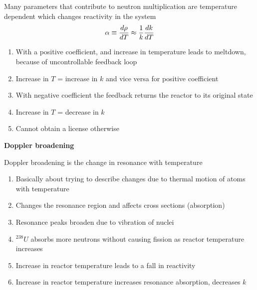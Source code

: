\documentclass[aspectratio=1610,pdftex,dvipsnames,compress,xcolor={dvipsnames}]{beamer}
\begin{document}
\addtocounter{framenumber}{-1} 
\begin{frame}{Many parameters that contribute to neutron multiplication are temperature dependent which changes reactivity in the system}
    \begin{equation}
        \LARGE
        \alpha \equiv \frac{d\rho}{dT} \approx \frac{1}{k} \frac{dk}{dT}
    \end{equation}

    \vspace*{\fill}

    \begin{enumerate}[series=outerlist,topsep=0pt,itemsep=21pt,leftmargin=*,label=(\arabic*)]
        \item[]With a positive coefficient, and increase in temperature leads to meltdown, because of uncontrollable feedback loop
        \item[]Increase in $T$ = increase in $k$ and vice versa for positive coefficient
        \item[]With negative coefficient the feedback returns the reactor to its original state
        \item[]Increase in $T$ = decrease in $k$
        \item[]Cannot obtain a license otherwise
    \end{enumerate}
\end{frame}


\begin{frame}[plain]{}
    \centering\LARGE\textbf{Doppler broadening}
\end{frame}


\addtocounter{framenumber}{-1} 
\begin{frame}{Doppler broadening is the change in resonance with temperature}
    \begin{enumerate}[series=outerlist,topsep=0pt,itemsep=21pt,leftmargin=*,label=(\arabic*)]
        \item[]Basically about trying to describe changes due to thermal motion of atoms with temperature
        \item[]Changes the resonance region and affects cross sections (absorption)
        \item[]Resonance peaks broaden due to vibration of nuclei
        \item[]$^{238}U$ absorbs more neutrons without causing fission as reactor temperature increases
        \item[]Increase in reactor temperature leads to a fall in reactivity
        \item[]Increase in reactor temperature increases resonance absorption, decreases $k$
    \end{enumerate}
\end{frame}
\end{document}
